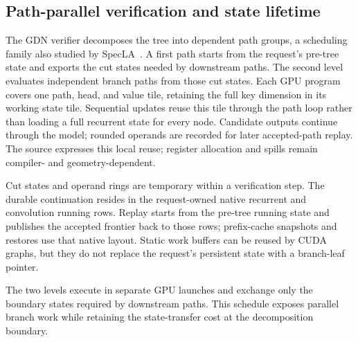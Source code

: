 \documentclass[conference]{IEEEtran}
\begin{document}
\subsection{Path-parallel verification and state lifetime}
The GDN verifier decomposes the tree into dependent path groups, a scheduling family also studied by SpecLA~\cite{wang2026specla}. A first path starts from the request's pre-tree state and exports the cut states needed by downstream paths. The second level evaluates independent branch paths from those cut states. Each GPU program covers one path, head, and value tile, retaining the full key dimension in its working state tile. Sequential updates reuse this tile through the path loop rather than loading a full recurrent state for every node. Candidate outputs continue through the model; rounded operands are recorded for later accepted-path replay. The source expresses this local reuse; register allocation and spills remain compiler- and geometry-dependent.

Cut states and operand rings are temporary within a verification step. The durable continuation resides in the request-owned native recurrent and convolution running rows. Replay starts from the pre-tree running state and publishes the accepted frontier back to those rows; prefix-cache snapshots and restores use that native layout. Static work buffers can be reused by CUDA graphs, but they do not replace the request's persistent state with a branch-leaf pointer.

The two levels execute in separate GPU launches and exchange only the boundary states required by downstream paths. This schedule exposes parallel branch work while retaining the state-transfer cost at the decomposition boundary.
\end{document}
